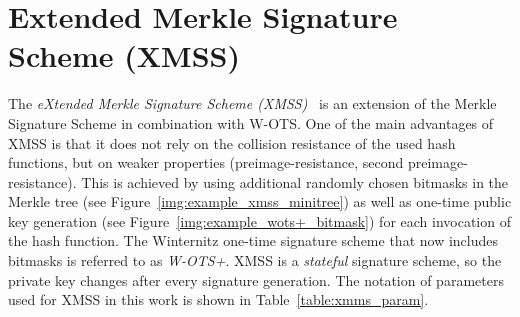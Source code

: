 

\section{Extended Merkle Signature Scheme (XMSS)}
The \textit{eXtended Merkle Signature Scheme (XMSS)}~\cite{xmss_RFC8391} is an extension of the Merkle Signature Scheme in combination with W-OTS. One of the main advantages of XMSS is that it does not rely on the collision resistance of the used hash functions, but on weaker properties (preimage-resistance, second preimage-resistance). This is achieved by using additional randomly chosen bitmasks in the Merkle tree (see Figure~\ref{img:example_xmss_minitree}) as well as one-time public key generation (see Figure~\ref{img:example_wots+_bitmask}) for each invocation of the hash function. The Winternitz one-time signature scheme that now includes bitmasks is referred to as \textit{W-OTS+}. XMSS is a \textit{stateful} signature scheme, so the private key changes after every signature generation. %
The notation of parameters used for XMSS in this work is shown in Table~\ref{table:xmms_param}.

